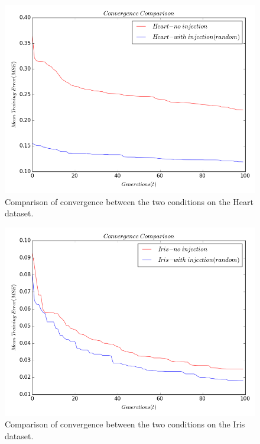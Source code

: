 \documentclass[12pt]{article} %
\begin{document}
\begin{figure}[here]
\includegraphics[scale=0.6]{errs_no_inject_convergence_Heart.png}
\caption{\label{Convergence_cancer_injection} Comparison of convergence between the two conditions on the Heart dataset. }
\end{figure}

\begin{figure}[here]
\includegraphics[scale=0.6]{errs_no_inject_convergence_Iris.png}
\caption{\label{Convergence_cancer_injection} Comparison of convergence between the two conditions on the Iris dataset.}
\end{figure}
\end{document}
